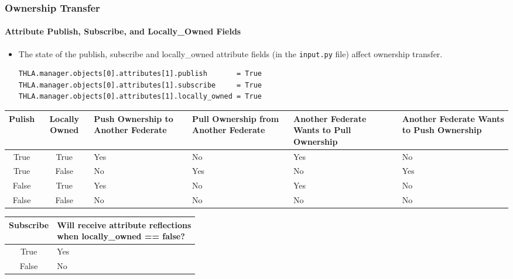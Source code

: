    \begin{frame}[fragile]
      \frametitle{Ownership Transfer}
      \framesubtitle{Attribute Publish, Subscribe, and Locally\_Owned Fields}
      \begin{itemize}
         \item The state of the publish, subscribe and locally\_owned attribute
         fields (in the \texttt{input.py} file) affect ownership transfer.
         \vspace{0.2cm}
\begin{Verbatim}[frame=single, fontsize=\footnotesize]
THLA.manager.objects[0].attributes[1].publish       = True
THLA.manager.objects[0].attributes[1].subscribe     = True
THLA.manager.objects[0].attributes[1].locally_owned = True
\end{Verbatim}
      \end{itemize}
\begin{tiny}
\begin{center}
\begin{tabular}{|c|c|C{1.7cm}|C{1.7cm}|C{1.7cm}|C{1.7cm}|} \hline
\textbf{Pulish} & \textbf{Locally Owned} & \textbf{Push Ownership to Another Federate}
& \textbf{Pull Ownership from Another Federate}
& \textbf{Another Federate Wants to Pull Ownership}
& \textbf{Another Federate Wants to Push Ownership} \\ \hline
True  & True  & Yes & No  & Yes & No  \\ \hline
True  & False & No  & Yes & No  & Yes \\ \hline
False & True  & Yes & No  & Yes & No  \\ \hline
False & False & No  & No  & No  & No  \\ \hline
\end{tabular}
\end{center}
\end{tiny}
\begin{scriptsize}
\begin{center}
\begin{tabular}{|c|C{5cm}|} \hline
\textbf{Subscribe} & \textbf{Will receive attribute reflections \newline when locally\_owned == false?} \\ \hline
True & Yes \\ \hline
False & No \\ \hline
\end{tabular}
\end{center}
\end{scriptsize}
   \end{frame}

